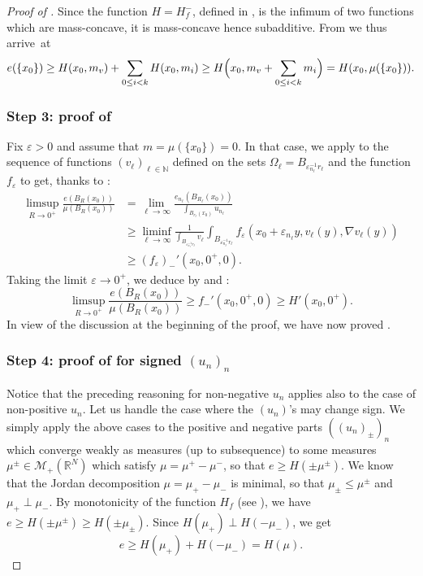 \documentclass[10pt]{amsart}
\theoremstyle{plain}
\theoremstyle{definition}
\newcommand{\N}{\mathbb{N}}
\newcommand{\R}{\mathbb{R}}
\newcommand{\Mspace}{\mathscr{M}}
\newcommand{\eps}{\varepsilon}
\begin{document}
\begin{proof}[Proof of ]
Since the function \(H=H_f^-\), defined in , is the infimum of two functions which are mass-concave, it is mass-concave hence subadditive. From  we thus arrive~at
\[
e(\{x_0\})\geq H(x_0,m_v) + \sum_{0\leq i<k}H(x_0,m_i) \geq H\Bigl(x_0,m_v+\sum_{0\leq i<k}m_i\Bigr)=H(x_0,\mu(\{x_0\})).
\]

\subsubsection*{Step 3: proof of } Fix $\eps >0$ and assume that \(m=\mu(\{x_0\})=0\). In that case, we apply  to the sequence of functions $(v_\ell)_{\ell\in\N}$ defined on the sets $\Omega_\ell = B_{\eps_{n_\ell}^{-1}r_\ell}$ and the function $f_\eps$ to get, thanks to :
\begin{align*}
\limsup_{R\to 0^+}\frac{e(B_R(x_0))}{\mu(B_R(x_0))} &= \lim_{\ell\to \infty} \frac{e_{n_\ell}(B_{R_\ell}(x_0))}{\int_{B_{r_\ell}(x_0)} u_{n_\ell}}\\
&\geq \liminf_{\ell\to\infty}\frac{1}{\int_{B_{\eps_{n_\ell}^{-1}r_\ell}} v_{\ell}}\int_{B_{\eps_{n_\ell}^{-1}r_\ell}} f_{\eps}(x_0+\eps_{n_\ell}y,v_\ell(y),\nabla v_\ell(y)) \\
&\geq (f_\eps)_-'(x_0,0^+,0).
\end{align*}
Taking the limit $\eps \to 0^+$, we deduce by  and :
\begin{equation}\label{vanishingDiffuse}
\limsup_{R\to 0^+}\frac{e(B_R(x_0))}{\mu(B_R(x_0))} \geq f_-'(x_0,0^+,0) \geq H'(x_0,0^+).
\end{equation}
In view of the discussion at the beginning of the proof, we have now proved .

\subsubsection*{Step 4: proof of  for signed $(u_n)_n$} Notice that the preceding reasoning for non-negative $u_n$ applies also to the case of non-positive $u_n$. Let us handle the case where the $(u_n)$'s may change sign. We simply apply the above cases to the positive and negative parts $((u_n)_\pm)_n$ which converge weakly as measures (up to subsequence) to some measures $\mu^\pm \in \Mspace_+(\R^N)$ which satisfy $\mu = \mu^+ - \mu^-$, so that $e\geq H(\pm \mu^\pm)$. We know that the Jordan decomposition $\mu = \mu_+-\mu_-$ is minimal, so that $\mu_\pm \leq \mu^\pm$ and $\mu_+ \perp \mu_-$. By monotonicity of the function $H_f$ (see ), we have $e\geq H(\pm \mu^\pm) \geq H(\pm \mu_\pm)$. Since $H(\mu_+) \perp H(- \mu_-)$, we get
\[e \geq H(\mu_+) + H(-\mu_-) = H(\mu).\]


\end{proof}
\end{document}
